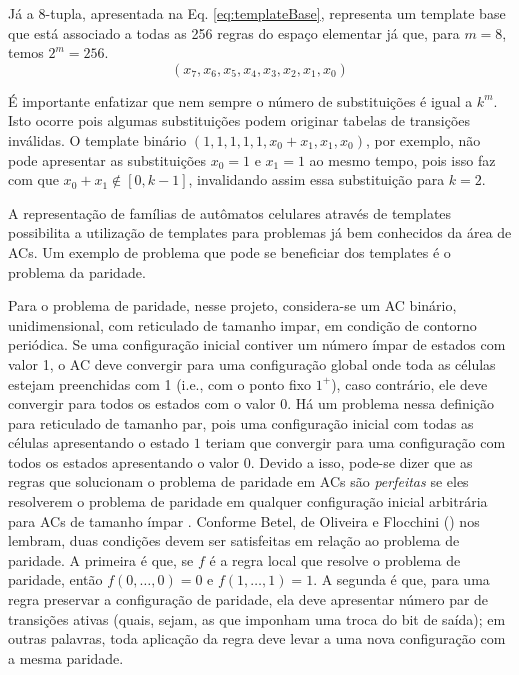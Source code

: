 Já a $8$-tupla, apresentada na Eq. \eqref{eq:templateBase}, representa um template base que está associado a todas as 256 regras do espaço elementar já que, para $m = 8$, temos $2^m = 256 $.
\begin{equation}
(x_7,x_6,x_5,x_4,x_3,x_2,x_1,x_0)
\label{eq:templateBase}
\end{equation}

É importante enfatizar que nem sempre o número de substituições é igual a $k^m$. Isto ocorre pois algumas substituições podem originar tabelas de transições inválidas. O template binário $(1,1,1,1,1,x_0+x_1,x_1,x_0)$, por exemplo, não pode apresentar as substituições $x_0=1$ e $x_1=1$ ao mesmo tempo, pois isso faz com que $x_0 + x_1 \notin [0, k-1]$, invalidando assim essa substituição para $k=2$.

A representação de famílias de autômatos celulares através de templates possibilita a utilização de templates para problemas já bem conhecidos da área de ACs. Um exemplo de problema que pode se beneficiar dos templates é o problema da paridade.

Para o problema de paridade, nesse projeto, considera-se um AC binário, unidimensional, com reticulado de tamanho impar, em condição de contorno periódica. Se uma configuração inicial contiver um número ímpar de estados com valor 1, o AC deve convergir para uma configuração global onde toda as células estejam preenchidas com 1 (i.e., com o ponto fixo $1^+$), caso contrário, ele deve convergir para todos os estados com o valor 0. Há um problema nessa definição para  reticulado de tamanho par, pois uma configuração inicial com todas as células apresentando o estado $1$ teriam que convergir para uma configuração com todos os estados apresentando o valor $0$. Devido a isso, pode-se dizer que as regras que solucionam o problema de paridade em ACs são \textit{perfeitas} se eles resolverem o problema de paridade em qualquer configuração inicial arbitrária para ACs de tamanho ímpar \cite{Betel2013}. Conforme Betel, de Oliveira e Flocchini (\citeyear{Betel2013}) nos lembram, duas condições devem ser satisfeitas em relação ao problema de paridade. A primeira é que, se $f$ é a regra local que resolve o problema de paridade, então $f(0, \dots, 0) = 0$ e $f(1, \dots, 1) = 1$. A segunda é que, para uma regra preservar a configuração de paridade, ela deve apresentar número par de transições ativas (quais, sejam, as que imponham uma troca do bit de saída); em outras palavras, toda aplicação da regra deve levar a uma nova configuração com a mesma paridade.

